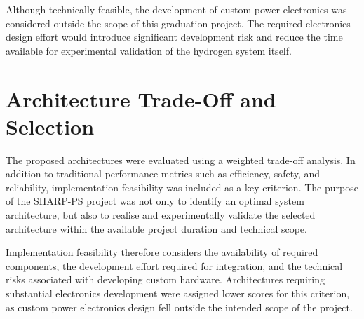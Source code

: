 Although technically feasible, the development of custom power electronics was considered outside the scope of this graduation project. The required electronics design effort would introduce significant development risk and reduce the time available for experimental validation of the hydrogen system itself.


\section{Architecture Trade-Off and Selection}




The proposed architectures were evaluated using a weighted trade-off analysis. In addition to traditional performance metrics such as efficiency, safety, and reliability, implementation feasibility was included as a key criterion. The purpose of the SHARP-PS project was not only to identify an optimal system architecture, but also to realise and experimentally validate the selected architecture within the available project duration and technical scope.

Implementation feasibility therefore considers the availability of required components, the development effort required for integration, and the technical risks associated with developing custom hardware. Architectures requiring substantial electronics development were assigned lower scores for this criterion, as custom power electronics design fell outside the intended scope of the project.


